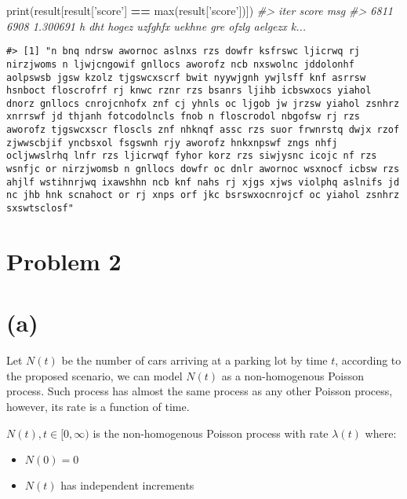 \documentclass[]{article}
\newenvironment{Shaded}{\begin{snugshade}}{\end{snugshade}}
\newcommand{\BuiltInTok}[1]{#1}
\newcommand{\CommentTok}[1]{\textcolor[rgb]{0.56,0.35,0.01}{\textit{#1}}}
\newcommand{\NormalTok}[1]{#1}
\newcommand{\OperatorTok}[1]{\textcolor[rgb]{0.81,0.36,0.00}{\textbf{#1}}}
\newcommand{\StringTok}[1]{\textcolor[rgb]{0.31,0.60,0.02}{#1}}
\providecommand{\tightlist}{%
  \setlength{\itemsep}{0pt}\setlength{\parskip}{0pt}}
\begin{document}
\begin{Shaded}
\begin{Highlighting}[]
\BuiltInTok{print}\NormalTok{(result[result[}\StringTok{'score'}\NormalTok{] }\OperatorTok{==} \BuiltInTok{max}\NormalTok{(result[}\StringTok{'score'}\NormalTok{])])}
\CommentTok{#>       iter     score                                                msg}
\CommentTok{#> 6811  6908  1.300691  h dht hogez uzfghfx uekhne gre ofzlg aelgezx k...}
\end{Highlighting}
\end{Shaded}

\begin{verbatim}
#> [1] "n bnq ndrsw awornoc aslnxs rzs dowfr ksfrswc ljicrwq rj nirzjwoms n ljwjcngowif gnllocs aworofz ncb nxswolnc jddolonhf aolpswsb jgsw kzolz tjgswcxscrf bwit nyywjgnh ywjlsff knf asrrsw hsnboct floscrofrf rj knwc rznr rzs bsanrs ljihb icbswxocs yiahol dnorz gnllocs cnrojcnhofx znf cj yhnls oc ljgob jw jrzsw yiahol zsnhrz xnrrswf jd thjanh fotcodolncls fnob n floscrodol nbgofsw rj rzs aworofz tjgswcxscr floscls znf nhknqf assc rzs suor frwnrstq dwjx rzof zjwwscbjif yncbsxol fsgswnh rjy aworofz hnkxnpswf zngs nhfj ocljwwslrhq lnfr rzs ljicrwqf fyhor korz rzs siwjysnc icojc nf rzs wsnfjc or nirzjwomsb n gnllocs dowfr oc dnlr awornoc wsxnocf icbsw rzs ahjlf wstihnrjwq ixawshhn ncb knf nahs rj xjgs xjws violphq aslnifs jd nc jhb hnk scnahoct or rj xnps orf jkc bsrswxocnrojcf oc yiahol zsnhrz sxswtsclosf"
\end{verbatim}

\hypertarget{problem-2}{%
\section{Problem 2}\label{problem-2}}

\hypertarget{a}{%
\section{(a)}\label{a}}

Let \textbf{\(N(t)\)} be the number of cars arriving at a parking lot by
time \textbf{\(t\)}, according to the proposed scenario, we can model
\textbf{\(N(t)\)} as a non-homogenous Poisson process. Such process has
almost the same process as any other Poisson process, however, its rate
is a function of time.

\(N(t), t \in [0, \infty)\) is the non-homogenous Poisson process with
rate \(\lambda (t)\) where:

\begin{itemize}
\tightlist
\item
  \(N(0) = 0\)
\item
  \(N(t)\) has independent increments
\end{itemize}
\end{document}
